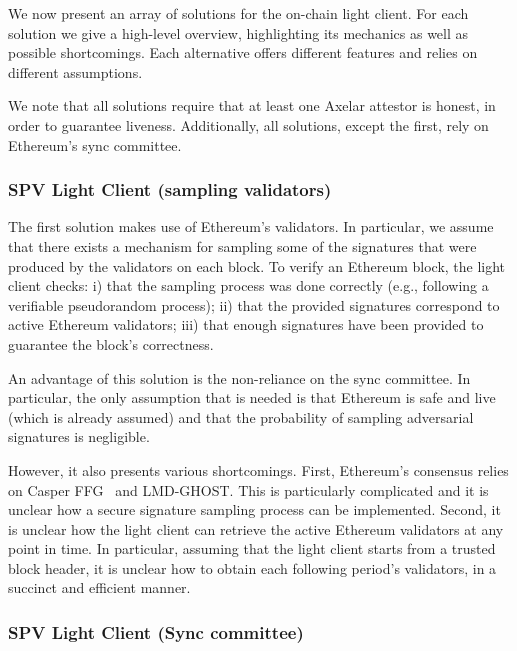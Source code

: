 
We now present an array of solutions for the on-chain light client. For each
solution we give a high-level overview, highlighting its mechanics as well as
possible shortcomings. Each alternative offers different features and relies on
different assumptions.

We note that all solutions require that at least one Axelar attestor is honest,
in order to guarantee liveness. Additionally, all solutions, except the first,
rely on Ethereum's sync committee.

\subsubsection{SPV Light Client (sampling validators)}

The first solution makes use of Ethereum's validators. In particular, we assume
that there exists a mechanism for sampling some of the signatures that were
produced by the validators on each block. To verify an Ethereum block, the
light client checks:
i) that the sampling process was done correctly (e.g., following a verifiable pseudorandom process);
ii) that the provided signatures correspond to active Ethereum validators;
iii) that enough signatures have been provided to guarantee the block's correctness.

An advantage of this solution is the non-reliance on the sync committee. In
particular, the only assumption that is needed is that Ethereum is safe and
live (which is already assumed) and that the probability of sampling
adversarial signatures is negligible.

However, it also presents various shortcomings.
First, Ethereum's consensus relies on Casper FFG~\cite{buterin2017casper} and
LMD-GHOST. This is particularly complicated and it is unclear how a secure
signature sampling process can be implemented.
Second, it is unclear how the light client can retrieve the active Ethereum
validators at any point in time. In particular, assuming that the light client
starts from a trusted block header, it is unclear how to obtain each following
period's validators, in a succinct and efficient manner.

\subsubsection{SPV Light Client (Sync committee)}

